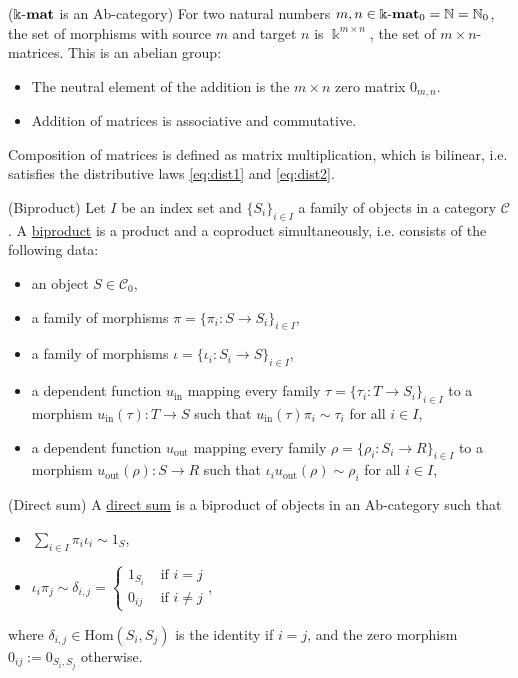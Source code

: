 \begin{example}{($\Bbbk\textnormal{-}\mathbf{mat}$ is an Ab-category)}
For two natural numbers $m,n \in {\Bbbk\textnormal{-}\mathbf{mat}}_{0} = \mathbb{N} = \mathbb{N}_{0}$, the set of morphisms with source $m$ and target $n$ is
$\Bbbk^{m\times n}$, the set of $m \times n$-matrices. This is an abelian group:
\begin{itemize}
\item The neutral element of the addition is the $m \times n$ zero matrix $0_{m,n}$.
\item Addition of matrices is associative and commutative.
\end{itemize}
Composition of matrices is defined as matrix multiplication, which is bilinear, i.e. satisfies the distributive laws \eqref{eq:dist1} and \eqref{eq:dist2}.
\end{example}

\begin{definition}{(Biproduct)}\label{def:biproduct}
Let $I$ be an index set and $\{S_{i}\}_{i\in I}$ a family of objects in a category $\mathcal{C}$.
A \ul{biproduct} is a product and a coproduct simultaneously, i.e. consists of the following data:
\begin{itemize}
\item an object $S \in \mathcal{C}_{0}$,
\item a family of morphisms $\pi = \{ \pi_{i} : S \rightarrow S_{i} \}_{i\in I}$,
\item a family of morphisms $\iota = \{ \iota_{i} : S_{i} \rightarrow S \}_{i\in I}$,
\item a dependent function $u_{\text{in}}$ mapping every family $\tau = \{ \tau_{i} : T \rightarrow S_{i} \}_{i\in I}$ to a morphism
$u_{\text{in}}(\tau) : T \rightarrow S$ such that $u_{\text{in}}(\tau) \pi_{i} \sim \tau_{i}$ for all $i \in I$,
\item a dependent function $u_{\text{out}}$ mapping every family $\rho = \{ \rho_{i} : S_{i} \rightarrow R \}_{i\in I}$ to a morphism
$u_{\text{out}}(\rho) : S \rightarrow R$ such that $\iota_{i} u_{\text{out}}(\rho) \sim \rho_{i}$ for all $i \in I$,
\end{itemize}
\end{definition}

\begin{definition}{(Direct sum)}\label{def:direct_sum}
A \ul{direct sum} is a biproduct of objects in an Ab-category such that
\begin{itemize}
\item $\sum_{i\in I}  \pi_{i} \iota_{i} \sim 1_{S}$,
\item $ \iota_{i} \pi_{j} \sim \delta_{i, j} =  \begin{cases}
            1_{S_{i}} & \text{ if } i = j  \\
            0_{ij} & \text{ if } i \neq j
        \end{cases}$,
\end{itemize}
where $\delta_{i, j} \in \mathrm{Hom}(S_{i}, S_{j})$ is the identity if $i = j$, and the zero morphism $0_{ij} := 0_{S_{i}, S_{j}}$ otherwise.
\end{definition}

